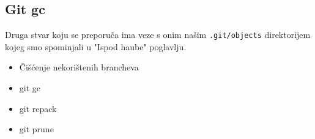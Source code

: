 \subsection*{Git gc}

Druga stvar koju se preporuča ima veze s onim našim \verb+.git/objects+ direktorijem kojeg smo spominjali u "Ispod haube" poglavlju.

\begin{itemize}
   \item Čišćenje nekorištenih brancheva
   \item git gc
   \item git repack
   \item git prune
\end{itemize}


